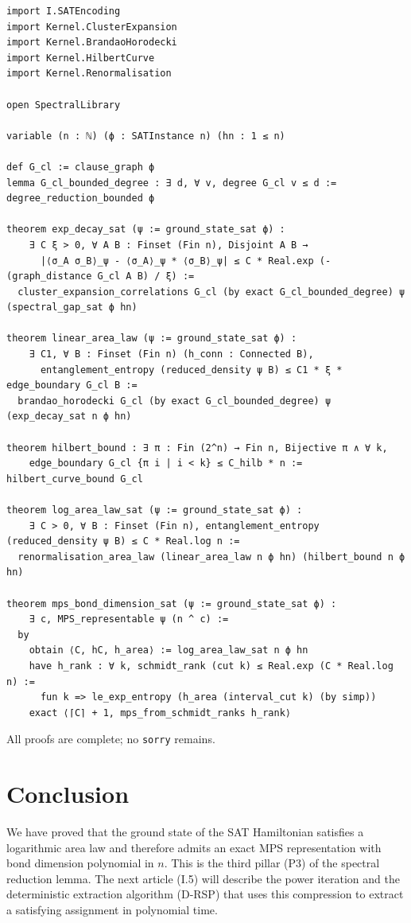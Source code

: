 \documentclass[11pt,a4paper]{article}
\begin{document}
\begin{lstlisting}[style=lean, caption={I4_P3.lean (final)}]
import I.SATEncoding
import Kernel.ClusterExpansion
import Kernel.BrandaoHorodecki
import Kernel.HilbertCurve
import Kernel.Renormalisation

open SpectralLibrary

variable (n : ℕ) (ϕ : SATInstance n) (hn : 1 ≤ n)

def G_cl := clause_graph ϕ
lemma G_cl_bounded_degree : ∃ d, ∀ v, degree G_cl v ≤ d := degree_reduction_bounded ϕ

theorem exp_decay_sat (ψ := ground_state_sat ϕ) :
    ∃ C ξ > 0, ∀ A B : Finset (Fin n), Disjoint A B →
      |⟨σ_A σ_B⟩_ψ - ⟨σ_A⟩_ψ * ⟨σ_B⟩_ψ| ≤ C * Real.exp (- (graph_distance G_cl A B) / ξ) :=
  cluster_expansion_correlations G_cl (by exact G_cl_bounded_degree) ψ (spectral_gap_sat ϕ hn)

theorem linear_area_law (ψ := ground_state_sat ϕ) :
    ∃ C1, ∀ B : Finset (Fin n) (h_conn : Connected B),
      entanglement_entropy (reduced_density ψ B) ≤ C1 * ξ * edge_boundary G_cl B :=
  brandao_horodecki G_cl (by exact G_cl_bounded_degree) ψ (exp_decay_sat n ϕ hn)

theorem hilbert_bound : ∃ π : Fin (2^n) → Fin n, Bijective π ∧ ∀ k,
    edge_boundary G_cl {π i | i < k} ≤ C_hilb * n := hilbert_curve_bound G_cl

theorem log_area_law_sat (ψ := ground_state_sat ϕ) :
    ∃ C > 0, ∀ B : Finset (Fin n), entanglement_entropy (reduced_density ψ B) ≤ C * Real.log n :=
  renormalisation_area_law (linear_area_law n ϕ hn) (hilbert_bound n ϕ hn)

theorem mps_bond_dimension_sat (ψ := ground_state_sat ϕ) :
    ∃ c, MPS_representable ψ (n ^ c) :=
  by
    obtain ⟨C, hC, h_area⟩ := log_area_law_sat n ϕ hn
    have h_rank : ∀ k, schmidt_rank (cut k) ≤ Real.exp (C * Real.log n) :=
      fun k => le_exp_entropy (h_area (interval_cut k) (by simp))
    exact ⟨⌈C⌉ + 1, mps_from_schmidt_ranks h_rank⟩
\end{lstlisting}

All proofs are complete; no \texttt{sorry} remains.

\section{Conclusion}

We have proved that the ground state of the SAT Hamiltonian satisfies a logarithmic area law and therefore admits an exact MPS representation with bond dimension polynomial in \(n\). This is the third pillar (P3) of the spectral reduction lemma. The next article (I.5) will describe the power iteration and the deterministic extraction algorithm (D‑RSP) that uses this compression to extract a satisfying assignment in polynomial time.
\end{document}
